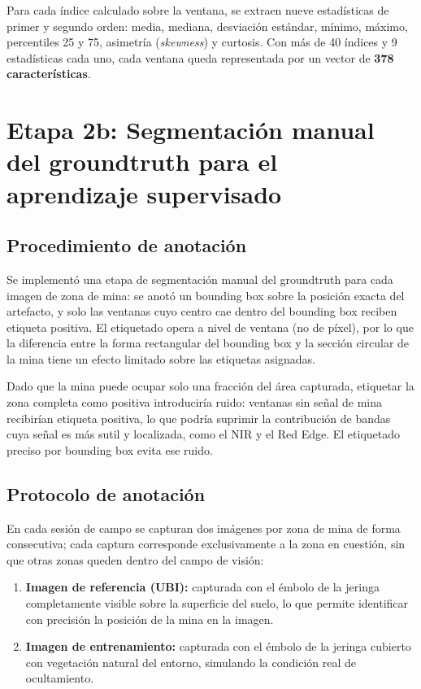 Para cada índice calculado sobre la ventana, se extraen nueve estadísticas de
primer y segundo orden: media, mediana, desviación estándar, mínimo, máximo,
percentiles 25 y 75, asimetría (\textit{skewness}) y curtosis. Con más de 40
índices y 9 estadísticas cada uno, cada ventana queda representada por un vector
de \textbf{378 características}.

\section{Etapa 2b: Segmentación manual del groundtruth para el aprendizaje supervisado}
\label{sec:segmentacion_groundtruth}

\subsection{Procedimiento de anotación}

Se implementó una etapa de segmentación manual del groundtruth para cada imagen
de zona de mina: se anotó un bounding box sobre la posición exacta del
artefacto, y solo las ventanas cuyo centro cae dentro del bounding box reciben
etiqueta positiva. El etiquetado opera a nivel de ventana (no de píxel), por lo
que la diferencia entre la forma rectangular del bounding box y la sección
circular de la mina tiene un efecto limitado sobre las etiquetas asignadas.

Dado que la mina puede ocupar solo una fracción del área capturada, etiquetar la
zona completa como positiva introduciría ruido: ventanas sin señal de mina
recibirían etiqueta positiva, lo que podría suprimir la contribución de bandas
cuya señal es más sutil y localizada, como el \ac{NIR} y el Red Edge. El
etiquetado preciso por bounding box evita ese ruido.

\subsection{Protocolo de anotación}

En cada sesión de campo se capturan dos imágenes por zona de mina de forma
consecutiva; cada captura corresponde exclusivamente a la zona en cuestión,
sin que otras zonas queden dentro del campo de visión:

\begin{enumerate}
  \item \textbf{Imagen de referencia (UBI):} capturada con el émbolo de la
    jeringa completamente visible sobre la superficie del suelo, lo que
    permite identificar con precisión la posición de la mina en la imagen.
  \item \textbf{Imagen de entrenamiento:} capturada con el émbolo de la
    jeringa cubierto con vegetación natural del entorno, simulando la
    condición real de ocultamiento.
\end{enumerate}

